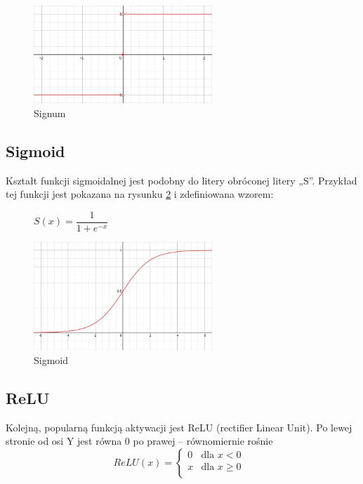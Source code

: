 \documentclass{article}
\begin{document}
\begin{figure}[H]
	\centering
	\includegraphics[width=0.6\textwidth,keepaspectratio=true]{Signum}
	\caption{
		Signum
	}
	\label{Signum}
\end{figure}


\subsection{Sigmoid}
Kształt funkcji sigmoidalnej jest podobny do litery obróconej litery „S”.
Przykład tej funkcji jest pokazana na rysunku \ref{Sigmoid} i zdefiniowana wzorem: 


\begin{figure}[H]
	\begin{center}
		$S(x) = \dfrac{1}{1 + e^{-x}}$
	\end{center}
	
	\centering
	\includegraphics[width=0.6\textwidth,keepaspectratio=true]{Sigmoid}
	\caption{
		Sigmoid
	}
	\label{Sigmoid}
\end{figure}

\subsection{ReLU}
Kolejną, popularną funkcją aktywacji jest ReLU (rectifier Linear Unit). Po lewej stronie od osi Y jest równa 0 po prawej -- równomiernie rośnie
\begin{equation}
	ReLU(x) = 
	\begin{cases}
		0 & \text{dla $x < 0$}\\
		x & \text{dla $x \geqslant 0$ }\\
	\end{cases}    
\end{equation}
\end{document}
